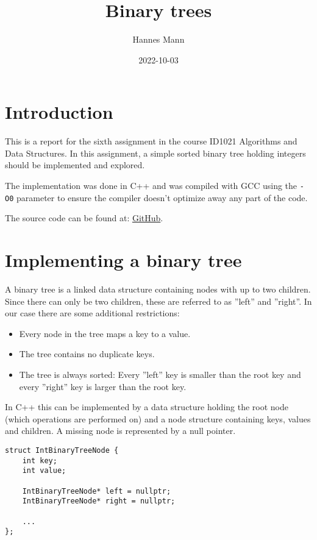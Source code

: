 \documentclass[a4paper,11pt]{article}
\begin{document}
\title{
    \textbf{Binary trees}
}
\author{Hannes Mann}
\date{2022-10-03}

\maketitle

\section*{Introduction}

This is a report for the sixth assignment in the course ID1021 Algorithms and Data Structures.
In this assignment, a simple sorted binary tree holding integers should be implemented and explored.

The implementation was done in C++ and was compiled with GCC using the {\tt -O0} parameter to ensure the compiler doesn't optimize away any part of the code.

The source code can be found at: \href{https://github.com/HannesMann/ID1021/tree/main/src/trees}{GitHub}.

\section*{Implementing a binary tree}

A binary tree is a linked data structure containing nodes with up to two children. Since there can only be two children, these are referred to as ''left'' and ''right''.
In our case there are some additional restrictions:
\begin{itemize}
	\item Every node in the tree maps a key to a value.
	\item The tree contains no duplicate keys.
	\item The tree is always sorted: Every ''left'' key is smaller than the root key and every ''right'' key is larger than the root key.
\end{itemize}

In C++ this can be implemented by a data structure holding the root node (which operations are performed on) and a node structure containing keys, values and children. A missing node is represented by a null pointer.

\begin{verbatim}
struct IntBinaryTreeNode {
	int key;
	int value;

	IntBinaryTreeNode* left = nullptr;
	IntBinaryTreeNode* right = nullptr;

	...
};
\end{verbatim}
\end{document}
